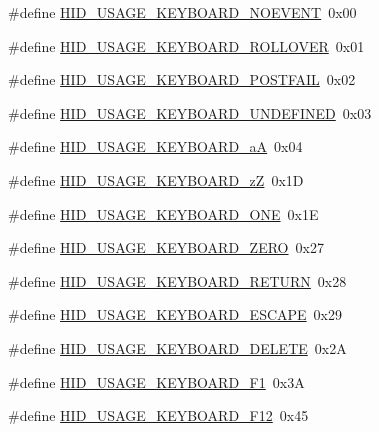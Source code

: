\begin{DoxyCompactItemize}
\item 
\#define \hyperlink{group__USBD__HID_ga85b93a68c76952d39c3bc1daf17df5e7}{H\-I\-D\-\_\-\-U\-S\-A\-G\-E\-\_\-\-K\-E\-Y\-B\-O\-A\-R\-D\-\_\-\-N\-O\-E\-V\-E\-N\-T}~0x00
\item 
\#define \hyperlink{group__USBD__HID_gaccadefb2a21b8bf36b8dd1157cbdd09d}{H\-I\-D\-\_\-\-U\-S\-A\-G\-E\-\_\-\-K\-E\-Y\-B\-O\-A\-R\-D\-\_\-\-R\-O\-L\-L\-O\-V\-E\-R}~0x01
\item 
\#define \hyperlink{group__USBD__HID_ga279f656907c776cd36e1e199dcd4d00b}{H\-I\-D\-\_\-\-U\-S\-A\-G\-E\-\_\-\-K\-E\-Y\-B\-O\-A\-R\-D\-\_\-\-P\-O\-S\-T\-F\-A\-I\-L}~0x02
\item 
\#define \hyperlink{group__USBD__HID_gabdf4fffe05a95c305c098c701147082e}{H\-I\-D\-\_\-\-U\-S\-A\-G\-E\-\_\-\-K\-E\-Y\-B\-O\-A\-R\-D\-\_\-\-U\-N\-D\-E\-F\-I\-N\-E\-D}~0x03
\item 
\#define \hyperlink{group__USBD__HID_ga59f598363095effd3b6a9ece083ff78b}{H\-I\-D\-\_\-\-U\-S\-A\-G\-E\-\_\-\-K\-E\-Y\-B\-O\-A\-R\-D\-\_\-a\-A}~0x04
\item 
\#define \hyperlink{group__USBD__HID_ga98210a9fe6de0fe8af43db6a46559139}{H\-I\-D\-\_\-\-U\-S\-A\-G\-E\-\_\-\-K\-E\-Y\-B\-O\-A\-R\-D\-\_\-z\-Z}~0x1\-D
\item 
\#define \hyperlink{group__USBD__HID_ga8170c3b8a8c895fc203a185eaa1bdccb}{H\-I\-D\-\_\-\-U\-S\-A\-G\-E\-\_\-\-K\-E\-Y\-B\-O\-A\-R\-D\-\_\-\-O\-N\-E}~0x1\-E
\item 
\#define \hyperlink{group__USBD__HID_gad1bf5d7345921ff532e8aac27826fcb8}{H\-I\-D\-\_\-\-U\-S\-A\-G\-E\-\_\-\-K\-E\-Y\-B\-O\-A\-R\-D\-\_\-\-Z\-E\-R\-O}~0x27
\item 
\#define \hyperlink{group__USBD__HID_ga0a7a3c7ac4e69addd8eda1da31574a09}{H\-I\-D\-\_\-\-U\-S\-A\-G\-E\-\_\-\-K\-E\-Y\-B\-O\-A\-R\-D\-\_\-\-R\-E\-T\-U\-R\-N}~0x28
\item 
\#define \hyperlink{group__USBD__HID_gab523b015e0060fca13b8f100630a6e6a}{H\-I\-D\-\_\-\-U\-S\-A\-G\-E\-\_\-\-K\-E\-Y\-B\-O\-A\-R\-D\-\_\-\-E\-S\-C\-A\-P\-E}~0x29
\item 
\#define \hyperlink{group__USBD__HID_gaf1f78802de2995056015ce8dabf21efd}{H\-I\-D\-\_\-\-U\-S\-A\-G\-E\-\_\-\-K\-E\-Y\-B\-O\-A\-R\-D\-\_\-\-D\-E\-L\-E\-T\-E}~0x2\-A
\item 
\#define \hyperlink{group__USBD__HID_ga9ea2479fe9a71562a02bc3788b0df998}{H\-I\-D\-\_\-\-U\-S\-A\-G\-E\-\_\-\-K\-E\-Y\-B\-O\-A\-R\-D\-\_\-\-F1}~0x3\-A
\item 
\#define \hyperlink{group__USBD__HID_gaeb5ad09697c27e0982443080d198accd}{H\-I\-D\-\_\-\-U\-S\-A\-G\-E\-\_\-\-K\-E\-Y\-B\-O\-A\-R\-D\-\_\-\-F12}~0x45

\end{DoxyCompactItemize}
